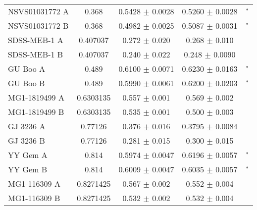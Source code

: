 \documentclass[fleqn,usenatbib]{mnras}
\begin{document}
\begin{table*}
\begin{center}
\begin{tabular}{lcccc}
NSVS01031772 A & 0.368 & 0.5428 $\pm$ 0.0028 & 0.5260 $\pm$ 0.0028 & \cite{Southworth15}$^{\rm *}$ \\ %
NSVS01031772 B & 0.368 & 0.4982 $\pm$ 0.0025 & 0.5087 $\pm$ 0.0031 & \cite{Southworth15}$^{\rm *}$ \\ %
SDSS-MEB-1 A & 0.407037 & 0.272 $\pm$ 0.020 & 0.268 $\pm$ 0.010 & \cite{Blake08} \\ %
SDSS-MEB-1 B & 0.407037 & 0.240 $\pm$ 0.022 & 0.248 $\pm$ 0.0090 & \cite{Blake08} \\ %
GU Boo A & 0.489 & 0.6100 $\pm$ 0.0071 & 0.6230 $\pm$ 0.0163 & \cite{Southworth15}$^{\rm *}$ \\ %
GU Boo B & 0.489 & 0.5990 $\pm$ 0.0061 & 0.6200 $\pm$ 0.0203 & \cite{Southworth15}$^{\rm *}$ \\ %
MG1-1819499 A & 0.6303135 & 0.557 $\pm$ 0.001 & 0.569 $\pm$ 0.002 & \cite{Kraus11} \\ %
MG1-1819499 B & 0.6303135 & 0.535 $\pm$ 0.001 & 0.500 $\pm$ 0.003 & \cite{Kraus11} \\ %
GJ 3236 A & 0.77126 & 0.376 $\pm$ 0.016 & 0.3795 $\pm$ 0.0084 & \cite{Irwin09} \\ %
GJ 3236 B & 0.77126 & 0.281 $\pm$ 0.015 & 0.300 $\pm$ 0.015 & \cite{Irwin09} \\ %
YY Gem A & 0.814 & 0.5974 $\pm$ 0.0047 & 0.6196 $\pm$ 0.0057 & \cite{Southworth15}$^{\rm *}$ \\ %
YY Gem B & 0.814 & 0.6009 $\pm$ 0.0047 & 0.6035 $\pm$ 0.0057 & \cite{Southworth15}$^{\rm *}$ \\ %
MG1-116309 A & 0.8271425 & 0.567 $\pm$ 0.002 & 0.552 $\pm$ 0.004 & \cite{Kraus11} \\ %
MG1-116309 B & 0.8271425 & 0.532 $\pm$ 0.002 & 0.532 $\pm$ 0.004 & \cite{Kraus11} \\ %

\end{tabular}
\end{center}
\end{table*}
\end{document}
